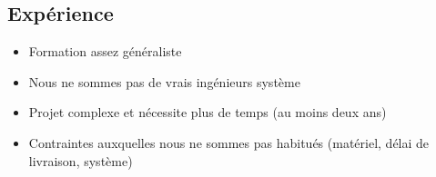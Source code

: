 \documentclass{beamer}
\begin{document}
{      %
      \subsection{Expérience}
	\begin{frame}
	  \begin{itemize}
	    \item Formation assez généraliste
	    \item Nous ne sommes pas de vrais ingénieurs système
	    \item Projet complexe et nécessite plus de temps (au moins deux ans)
	    \item Contraintes auxquelles nous ne sommes pas habitués (matériel, délai de livraison, système)
	  \end{itemize}
	\end{frame}
  }
  
\end{document}
